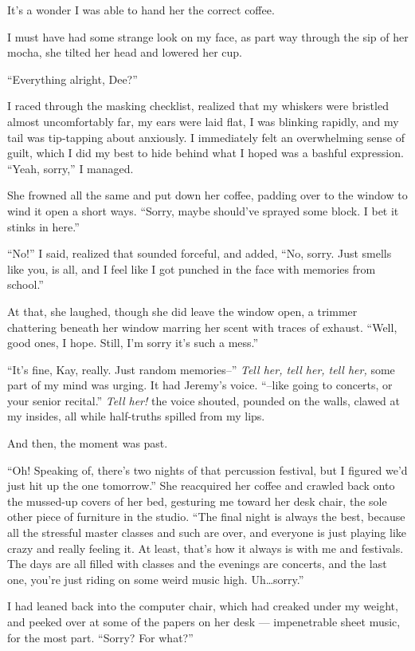 It's a wonder I was able to hand her the correct coffee.

I must have had some strange look on my face, as part way through the sip of her mocha, she tilted her head and lowered her cup.

``Everything alright, Dee?''

I raced through the masking checklist, realized that my whiskers were bristled almost uncomfortably far, my ears were laid flat, I was blinking rapidly, and my tail was tip-tapping about anxiously. I immediately felt an overwhelming sense of guilt, which I did my best to hide behind what I hoped was a bashful expression. ``Yeah, sorry,'' I managed.

She frowned all the same and put down her coffee, padding over to the window to wind it open a short ways. ``Sorry, maybe should've sprayed some block. I bet it stinks in here.''

``No!'' I said, realized that sounded forceful, and added, ``No, sorry. Just smells like you, is all, and I feel like I got punched in the face with memories from school.''

At that, she laughed, though she did leave the window open, a trimmer chattering beneath her window marring her scent with traces of exhaust. ``Well, good ones, I hope. Still, I'm sorry it's such a mess.''

``It's fine, Kay, really. Just random memories--'' \emph{Tell her, tell her, tell her,} some part of my mind was urging. It had Jeremy's voice. ``--like going to concerts, or your senior recital.'' \emph{Tell her!} the voice shouted, pounded on the walls, clawed at my insides, all while half-truths spilled from my lips.

And then, the moment was past.

``Oh! Speaking of, there's two nights of that percussion festival, but I figured we'd just hit up the one tomorrow.'' She reacquired her coffee and crawled back onto the mussed-up covers of her bed, gesturing me toward her desk chair, the sole other piece of furniture in the studio. ``The final night is always the best, because all the stressful master classes and such are over, and everyone is just playing like crazy and really feeling it. At least, that's how it always is with me and festivals. The days are all filled with classes and the evenings are concerts, and the last one, you're just riding on some weird music high. Uh\ldots sorry.''

I had leaned back into the computer chair, which had creaked under my weight, and peeked over at some of the papers on her desk --- impenetrable sheet music, for the most part. ``Sorry? For what?''

